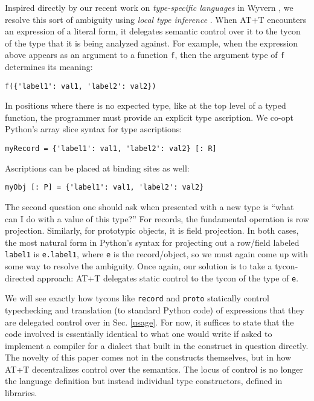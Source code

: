 \documentclass[preprint,10pt]{sigplanconf}
\newcommand{\lip}[1]{\lstinline[language=Python,basicstyle=\ttfamily\small,deletendkeywords={tuple,buffer,map}]{#1}}
\begin{document}
Inspired directly by our recent work on \emph{type-specific languages} in Wyvern \cite{TSLs}, we resolve this sort of ambiguity using \emph{local type inference} \cite{Pierce:2000:LTI:345099.345100}. When AT+T encounters an expression  of a literal form, it delegates semantic control over it to the tycon of the type that it is being analyzed against. For example, when the expression above appears as an argument to a function \lip{f}, then the argument type of \lip{f} determines its meaning:
\begin{lstlisting}[numbers=none]
f({'label1': val1, 'label2': val2})
\end{lstlisting}
 In positions where there is no expected type, like at the top level of a typed function, the programmer must provide an explicit type ascription. We co-opt Python's array slice syntax for type ascriptions:
\begin{lstlisting}[numbers=none]
myRecord = {'label1': val1, 'label2': val2} [: R]
\end{lstlisting}
Ascriptions can be placed at binding sites as well:
\begin{lstlisting}[numbers=none]
myObj [: P] = {'label1': val1, 'label2': val2}
\end{lstlisting}

The second question one should ask when presented with a new type is ``what can I do with a value of this type?'' For records, the fundamental operation is row projection. Similarly, for prototypic objects, it is field projection. In both cases, the most natural form in Python's syntax for projecting out a row/field labeled \lip{label1} is \lip{e.label1}, where \lip{e} is the record/object, so we must again come up with some way to resolve the ambiguity. Once again, our solution is to take a {tycon-directed} approach: AT+T delegates static control to  the tycon of the type of \lip{e}. %

We will see exactly how  tycons like \lip{record} and \lip{proto} statically control typechecking and translation (to standard Python code) of expressions that they are delegated control over in Sec. \ref{usage}. For now, it suffices to state that the code involved is essentially identical to what one would write if asked to implement a compiler for a dialect that built in the construct in question directly. The novelty of this paper comes not in the constructs themselves, but in how AT+T decentralizes control over the semantics. The locus of control is no longer the language definition but instead individual type constructors, defined in libraries.
\end{document}
